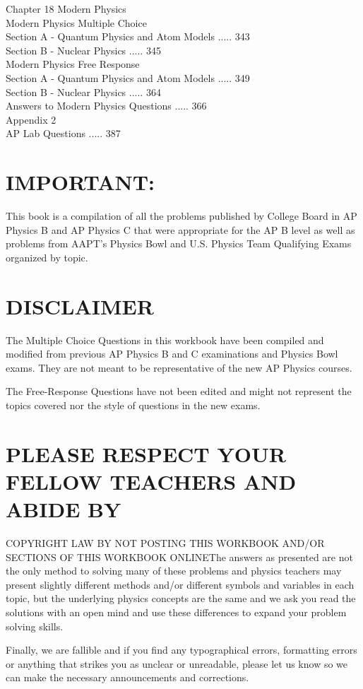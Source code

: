 Chapter 18 Modern Physics\\
Modern Physics Multiple Choice\\
Section A - Quantum Physics and Atom Models ..... 343\\
Section B - Nuclear Physics ..... 345\\
Modern Physics Free Response\\
Section A - Quantum Physics and Atom Models ..... 349\\
Section B - Nuclear Physics ..... 364\\
Answers to Modern Physics Questions ..... 366\\
Appendix 2\\
AP Lab Questions ..... 387

\section*{IMPORTANT:}
This book is a compilation of all the problems published by College Board in AP Physics B and AP Physics C that were appropriate for the AP B level as well as problems from AAPT's Physics Bowl and U.S. Physics Team Qualifying Exams organized by topic.

\section*{DISCLAIMER}
The Multiple Choice Questions in this workbook have been compiled and modified from previous AP Physics B and C examinations and Physics Bowl exams. They are not meant to be representative of the new AP Physics courses.

The Free-Response Questions have not been edited and might not represent the topics covered nor the style of questions in the new exams.

\section*{PLEASE RESPECT YOUR FELLOW TEACHERS AND ABIDE BY}
 COPYRIGHT LAW BY NOT POSTING THIS WORKBOOK AND/OR SECTIONS OF THIS WORKBOOK ONLINEThe answers as presented are not the only method to solving many of these problems and physics teachers may present slightly different methods and/or different symbols and variables in each topic, but the underlying physics concepts are the same and we ask you read the solutions with an open mind and use these differences to expand your problem solving skills.

Finally, we are fallible and if you find any typographical errors, formatting errors or anything that strikes you as unclear or unreadable, please let us know so we can make the necessary announcements and corrections.

